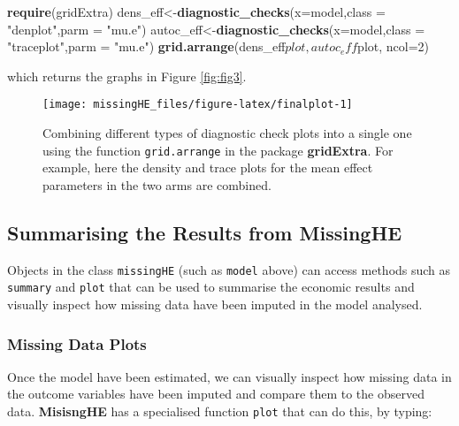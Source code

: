 \documentclass[]{article}
\newenvironment{Shaded}{\begin{snugshade}}{\end{snugshade}}
\newcommand{\KeywordTok}[1]{\textcolor[rgb]{0.13,0.29,0.53}{\textbf{{#1}}}}
\newcommand{\DataTypeTok}[1]{\textcolor[rgb]{0.13,0.29,0.53}{{#1}}}
\newcommand{\DecValTok}[1]{\textcolor[rgb]{0.00,0.00,0.81}{{#1}}}
\newcommand{\StringTok}[1]{\textcolor[rgb]{0.31,0.60,0.02}{{#1}}}
\newcommand{\NormalTok}[1]{{#1}}
\begin{document}
\begin{Shaded}
\begin{Highlighting}[]
\KeywordTok{require}\NormalTok{(gridExtra)}
\NormalTok{dens_eff<-}\KeywordTok{diagnostic_checks}\NormalTok{(}\DataTypeTok{x=}\NormalTok{model,}\DataTypeTok{class =} \StringTok{"denplot"}\NormalTok{,}\DataTypeTok{parm =} \StringTok{"mu.e"}\NormalTok{)}
\NormalTok{autoc_eff<-}\KeywordTok{diagnostic_checks}\NormalTok{(}\DataTypeTok{x=}\NormalTok{model,}\DataTypeTok{class =} \StringTok{"traceplot"}\NormalTok{,}\DataTypeTok{parm =} \StringTok{"mu.e"}\NormalTok{)}
\KeywordTok{grid.arrange}\NormalTok{(dens_eff$plot, autoc_eff$plot, }\DataTypeTok{ncol=}\DecValTok{2}\NormalTok{)}
\end{Highlighting}
\end{Shaded}

which returns the graphs in Figure \ref{fig:fig3}.

\begin{figure}[H]

{\centering \texttt{[image: missingHE\_files/figure-latex/finalplot-1]} 

}

\caption{\label{fig:fig3}Combining different types of diagnostic check plots into a single one using the function \texttt{grid.arrange} in the package \textbf{gridExtra}. For example, here the density and trace plots for the mean effect parameters in the two arms are combined.}\label{fig:finalplot}
\end{figure}

\subsection{Summarising the Results from
MissingHE}\label{summarising-the-results-from-missinghe}

Objects in the class \texttt{missingHE} (such as \texttt{model} above)
can access methods such as \texttt{summary} and \texttt{plot} that can
be used to summarise the economic results and visually inspect how
missing data have been imputed in the model analysed.

\subsubsection{Missing Data Plots}\label{missing-data-plots}

Once the model have been estimated, we can visually inspect how missing
data in the outcome variables have been imputed and compare them to the
observed data. \textbf{MisisngHE} has a specialised function
\texttt{plot} that can do this, by typing:
\end{document}
